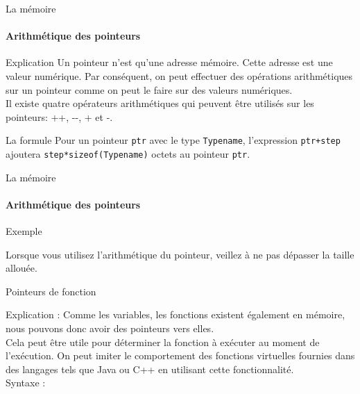 	\begin{frame}{La mémoire}
		\framesubtitle{Arithmétique des pointeurs}
		\begin{block}{Explication}
			Un pointeur n'est qu'une adresse mémoire. Cette adresse est une valeur numérique. Par conséquent, on peut effectuer des opérations arithmétiques sur un pointeur comme on peut le faire sur des valeurs numériques.\\ 
			Il existe quatre opérateurs arithmétiques qui peuvent être utilisés sur les pointeurs: \alert{++}, \alert{-{}-}, \alert{+} et \alert{-}.
		\end{block}
		\begin{block}{La formule}
			Pour un pointeur \alert{\texttt{ptr}} avec le type \alert{\texttt{Typename}}, l'expression \alert{\texttt{ptr+step}} ajoutera \alert{\texttt{step*sizeof(Typename)}} octets au pointeur \alert{\texttt{ptr}}.
		\end{block}
	\end{frame}
  	
  	\begin{frame}{La mémoire}
  		\framesubtitle{Arithmétique des pointeurs}
  		\begin{exampleblock}{Exemple}
  			\ptrArithExmp
  		\end{exampleblock}
  	
  		\begin{alertblock}{Lorsque vous utilisez l'arithmétique du pointeur, veillez à ne pas dépasser la taille allouée.}
  		\end{alertblock}
  	\end{frame}


  	\begin{frame}{Pointeurs de fonction}
  		\begin{block}{Explication :}
  			Comme les variables, les fonctions existent également en mémoire, nous pouvons donc avoir des pointeurs vers elles. \\
  			Cela peut être utile pour déterminer la fonction à exécuter au moment de l'exécution. On peut imiter le comportement des fonctions virtuelles fournies dans des langages tels que Java ou C++ en utilisant cette fonctionnalité.\\
  			\alert{Syntaxe :}
  			\funcPtrSyntax
  		\end{block}
  	\end{frame}
  	
